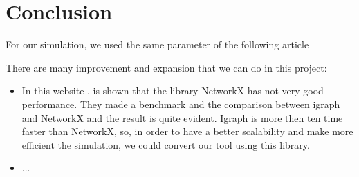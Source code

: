 
\section{Conclusion}
    For our simulation, we used the same parameter of the following article~\cite{}
    
    There are many improvement and expansion that we can do in this project:
    \begin{itemize}
        \item In this website \cite{performanceGraphTool}, is shown that the library NetworkX has not very good performance. They made a benchmark and the comparison between igraph~\cite{igraph} and NetworkX and the result is quite evident. Igraph is more then ten time faster than NetworkX, so, in order to have a better scalability and make more efficient the simulation, we could convert our tool using this library.
        \item ...
    \end{itemize}